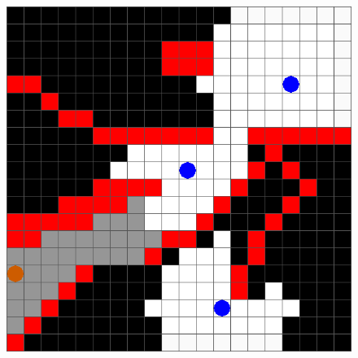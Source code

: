 \begin{figure}
\begin{minipage}{5.0cm}
{			\includegraphics[scale=0.12]{figs/results_t3.png}\hspace{.5cm}
		}
\end{minipage}
\end{figure}
